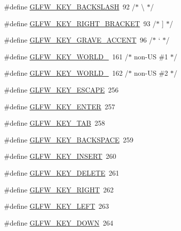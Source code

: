 \begin{DoxyCompactItemize}
\item 
\#define \hyperlink{group__keys_gab8155ea99d1ab27ff56f24f8dc73f8d1}{G\+L\+F\+W\+\_\+\+K\+E\+Y\+\_\+\+B\+A\+C\+K\+S\+L\+A\+S\+H}~92  /$\ast$ \textbackslash{} $\ast$/
\item 
\#define \hyperlink{group__keys_ga86ef225fd6a66404caae71044cdd58d8}{G\+L\+F\+W\+\_\+\+K\+E\+Y\+\_\+\+R\+I\+G\+H\+T\+\_\+\+B\+R\+A\+C\+K\+E\+T}~93  /$\ast$ \mbox{]} $\ast$/
\item 
\#define \hyperlink{group__keys_ga7a3701fb4e2a0b136ff4b568c3c8d668}{G\+L\+F\+W\+\_\+\+K\+E\+Y\+\_\+\+G\+R\+A\+V\+E\+\_\+\+A\+C\+C\+E\+N\+T}~96  /$\ast$ ` $\ast$/
\item 
\#define \hyperlink{group__keys_gadc78dad3dab76bcd4b5c20114052577a}{G\+L\+F\+W\+\_\+\+K\+E\+Y\+\_\+\+W\+O\+R\+L\+D\+\_}~161 /$\ast$ non-\/U\+S \#1 $\ast$/
\item 
\#define \hyperlink{group__keys_ga20494bfebf0bb4fc9503afca18ab2c5e}{G\+L\+F\+W\+\_\+\+K\+E\+Y\+\_\+\+W\+O\+R\+L\+D\+\_}~162 /$\ast$ non-\/U\+S \#2 $\ast$/
\item 
\#define \hyperlink{group__keys_gaac6596c350b635c245113b81c2123b93}{G\+L\+F\+W\+\_\+\+K\+E\+Y\+\_\+\+E\+S\+C\+A\+P\+E}~256
\item 
\#define \hyperlink{group__keys_ga9555a92ecbecdbc1f3435219c571d667}{G\+L\+F\+W\+\_\+\+K\+E\+Y\+\_\+\+E\+N\+T\+E\+R}~257
\item 
\#define \hyperlink{group__keys_ga6908a4bda9950a3e2b73f794bbe985df}{G\+L\+F\+W\+\_\+\+K\+E\+Y\+\_\+\+T\+A\+B}~258
\item 
\#define \hyperlink{group__keys_ga6c0df1fe2f156bbd5a98c66d76ff3635}{G\+L\+F\+W\+\_\+\+K\+E\+Y\+\_\+\+B\+A\+C\+K\+S\+P\+A\+C\+E}~259
\item 
\#define \hyperlink{group__keys_ga373ac7365435d6b0eb1068f470e34f47}{G\+L\+F\+W\+\_\+\+K\+E\+Y\+\_\+\+I\+N\+S\+E\+R\+T}~260
\item 
\#define \hyperlink{group__keys_gadb111e4df74b8a715f2c05dad58d2682}{G\+L\+F\+W\+\_\+\+K\+E\+Y\+\_\+\+D\+E\+L\+E\+T\+E}~261
\item 
\#define \hyperlink{group__keys_ga06ba07662e8c291a4a84535379ffc7ac}{G\+L\+F\+W\+\_\+\+K\+E\+Y\+\_\+\+R\+I\+G\+H\+T}~262
\item 
\#define \hyperlink{group__keys_gae12a010d33c309a67ab9460c51eb2462}{G\+L\+F\+W\+\_\+\+K\+E\+Y\+\_\+\+L\+E\+F\+T}~263
\item 
\#define \hyperlink{group__keys_gae2e3958c71595607416aa7bf082be2f9}{G\+L\+F\+W\+\_\+\+K\+E\+Y\+\_\+\+D\+O\+W\+N}~264
\item 

\end{DoxyCompactItemize}
